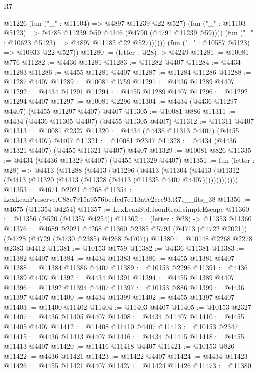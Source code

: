 \begin{lexlean}{R7}
\begin{coremodule}
                @11226
                  (fun ("_" : @11104) => @4897 @11239 @22 @527)
                  (fun ("_" : @11103 @5123) => @4785 @11239 @59 @4346 (@4790 (@4791 @11239 @59))))
                (fun ("_" : @10623 @5123) => @4897 @11182 @22 @527))))))
      (fun ("_" : @10587 @5123) => @10933 @22 @527))
@11280 := (letter : @28) -> @4249
@11281 := @10081 @776
@11282 := @4436 @11281
@11283 := @11282 @4407
@11284 := @4434 @11283
@11286 := @4455 @11281 @4407
@11287 := @11284 @11286
@11288 := @11287 @4407
@11289 := @10081 @1759
@11291 := @4436 @11289 @4407
@11292 := @4434 @11291
@11294 := @4455 @11289 @4407
@11296 := @11292 @11294 @4407
@11297 := @10081 @2296
@11304 := @4434 (@4436 @11297 @4407) (@4455 @11297 @4407) @4407
@11305 := @10081 @886
@11311 := @4434 (@4436 @11305 @4407) (@4455 @11305 @4407)
@11312 := @11311 @4407
@11313 := @10081 @2327
@11320 := @4434 (@4436 @11313 @4407) (@4455 @11313 @4407) @4407
@11321 := @10081 @2347
@11328 := @4434 (@4436 @11321 @4407) (@4455 @11321 @4407) @4407
@11329 := @10081 @826
@11335 := @4434 (@4436 @11329 @4407) (@4455 @11329 @4407)
@11351 := fun (letter : @28) =>
  @4413
    (@11288
      (@4413
        (@11296
          (@4413
            (@11304
              (@4413 (@11312 (@4413 (@11320 (@4413 (@11328 (@4413 (@11335 @4407 @4407)))))))))))))
@11353 := @4671 @2021 @4268
@11354 := LexLeanPreserve.C88e7915a9576beefed7e113a0c2cce93.R7.__fits_38
@11356 := @4675 (@11354 @4254)
@11357 := LexLeanStd.JsonRead.simpleEscape
@11360 := @11356 (@520 (@11357 @4254))
@11362 := (letter : @28) -> @11353 @11360
@11376 := @4689
    @2021
    @4268
    @11360
    @2385
    @5793
    (@4713 (@4722 @2021))
    (@4728 (@4729 (@4730 @2385) @4268 @4707))
@11380 := @10148 @2268 @2278 @2383 @4412
@11381 := @10153 @1759
@11382 := @4436 @11381
@11383 := @11382 @4407
@11384 := @4434 @11383
@11386 := @4455 @11381 @4407
@11388 := @11384 @11386 @4407
@11389 := @10153 @2296
@11391 := @4436 @11389 @4407
@11392 := @4434 @11391
@11394 := @4455 @11389 @4407
@11396 := @11392 @11394 @4407
@11397 := @10153 @886
@11399 := @4436 @11397 @4407
@11400 := @4434 @11399
@11402 := @4455 @11397 @4407
@11403 := @11400 @11402
@11404 := @11403 @4407
@11405 := @10153 @2327
@11407 := @4436 @11405 @4407
@11408 := @4434 @11407
@11410 := @4455 @11405 @4407
@11412 := @11408 @11410 @4407
@11413 := @10153 @2347
@11415 := @4436 @11413 @4407
@11416 := @4434 @11415
@11418 := @4455 @11413 @4407
@11420 := @11416 @11418 @4407
@11421 := @10153 @826
@11422 := @4436 @11421
@11423 := @11422 @4407
@11424 := @4434 @11423
@11426 := @4455 @11421 @4407
@11427 := @11424 @11426
@11473 := @11380

\end{coremodule}
\end{lexlean}
